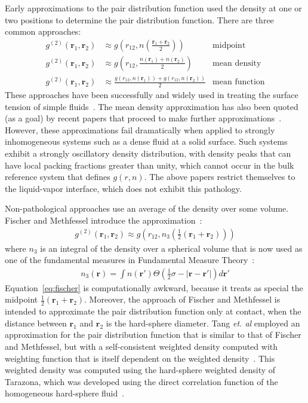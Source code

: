 \documentclass[letterpaper,twocolumn,amsmath,amssymb,pre,aps,10pt]{revtex4-1}
\newcommand{\rr}{\textbf{r}}
\begin{document}
Early approximations to the pair distribution function used the
density at one or two positions to determine the pair distribution
function.  There are three common approaches:
\begin{align}
  g^{(2)}(\rr_1,\rr_2) &\approx
  g\left(r_{12}, n\left(\frac{\rr_1+\rr_2}{2}\right)\right)
     & \text{midpoint} \\
  g^{(2)}(\rr_1,\rr_2) &\approx
  g\left(r_{12}, \frac{n(\rr_1)+n(\rr_2)}{2}\right)
     & \text{mean density} \\
  g^{(2)}(\rr_1,\rr_2) &\approx
  \frac{g(r_{12},n(\rr_1))+g(r_{12},n(\rr_2))}{2}
     & \text{mean function}
\end{align}
These approaches have been successfully and widely used in treating
the surface tension of simple fluids~\cite{pressing2003surface,
  salter2008statistical, bongiorno1975modified,
  toxvaerd1976hydrostatic, kalos1977structure, carey2008gradient,
  osborn1980monotonic, mccoy1981comparison, barrett2006some}.  The
mean density approximation has also been quoted (as a goal) by recent
papers that proceed to make further
approximations~\cite{gloor2007prediction, gross2009density}.  However,
these approximations fail dramatically when applied to strongly
inhomogeneous systems such as a dense fluid at a solid surface.  Such
systems exhibit a strongly oscillatory density distribution, with
density peaks that can have local packing fractions greater than
unity, which cannot occur in the bulk reference system that defines
$g(r, n)$.  The above papers restrict themselves to the liquid-vapor
interface, which does not exhibit this pathology.

Non-pathological approaches use an average of the density over some
volume. Fischer and Methfessel introduce the
approximation~\cite{fischer1980born,harris1987comment}:
\begin{align}
  g^{(2)}(\rr_1,\rr_2) \approx g\left(r_{12}, n_3\left(\tfrac12
  (\rr_1+\rr_2)\right)\right)
  \label{eq:fischer}
\end{align}
where $n_3$ is an integral of the density over a spherical volume that
is now used as one of the fundamental measures in Fundamental
Measure Theory~\cite{rosenfeld1989free}:
\begin{align}
  n_3(\rr) = \int n(\rr')\Theta(\tfrac12 \sigma - |\rr-\rr'|) d\rr'
\end{align}
Equation~\ref{eq:fischer} is computationally awkward, because it
treats as special the midpoint $\tfrac12(\rr_1+\rr_2)$.  Moreover, the
approach of Fischer and Methfessel is intended to approximate the pair
distribution function only at contact, when the distance between
$\rr_1$ and $\rr_2$ is the hard-sphere diameter.
%
Tang \emph{et. al} employed an approximation for the pair distribution
function that is similar to that of Fischer and Methfessel, but with a
self-consistent weighted density computed with weighting function that
is itself dependent on the weighted density~\cite{tang1991density}.
This weighted density was computed using the hard-sphere weighted
density of Tarazona, which was developed using the direct correlation
function of the homogeneous hard-sphere fluid~\cite{tarazona1985free}.
\end{document}

